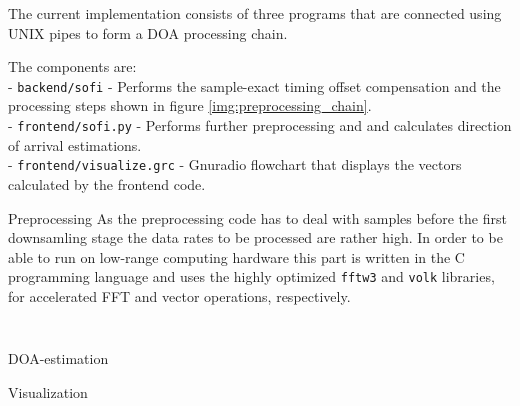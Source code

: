The current implementation consists of three
programs that are connected using UNIX pipes
to form a DOA processing chain.

The components are: \\

- \texttt{backend/sofi} - Performs the sample-exact
timing offset compensation and the processing steps
shown in figure \ref{img:preprocessing_chain}. \\

- \texttt{frontend/sofi.py} - Performs further preprocessing
and and calculates direction of arrival estimations. \\

- \texttt{frontend/visualize.grc} - Gnuradio flowchart
that displays the vectors calculated by the frontend code. \\

\begin{subchapter}{Preprocessing}
  As the preprocessing code has to deal with samples
  before the first downsamling stage the data rates to be
  processed are rather high.
  In order to be able to run on low-range computing hardware
  this part is written in the C programming language and
  uses the highly optimized \texttt{fftw3} and \texttt{volk}
  libraries, for accelerated FFT and vector operations, respectively. \\

  \begin{lstlisting}[language=C]
    
  \end{lstlisting}
\end{subchapter}

\begin{subchapter}{DOA-estimation}
\end{subchapter}

\begin{subchapter}{Visualization}
\end{subchapter}

